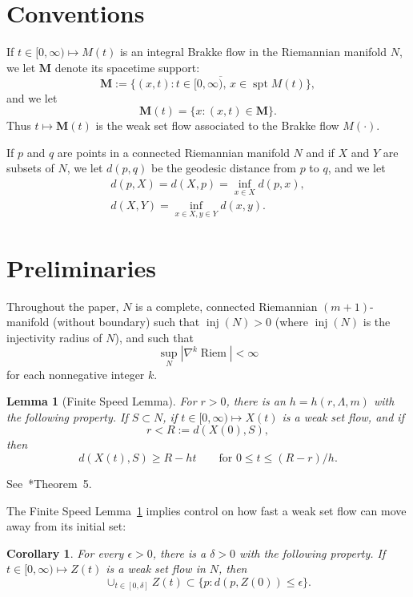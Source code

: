 \documentclass{amsart}
\newcommand{\inj}{\operatorname{inj}}    %
\newcommand{\MMM}{\mathbf M}
\newcommand{\Riem}{\operatorname{Riem}}
\newcommand{\eps}{\epsilon}
\newcommand{\spt}{\operatorname{spt}}
\newtheorem{lemma}      [theorem]       {Lemma}
\newtheorem{corollary}  [theorem]     {Corollary}
\theoremstyle{definition}
\theoremstyle{definition}
\begin{document}
\section{Conventions}\label{conventions-section}


If $t\in [0,\infty)\mapsto M(t)$ is an integral 
Brakke flow in the Riemannian manifold $N$, we let $\MMM$ denote
its spacetime support:
\[
   \MMM:= \overline{ \{ (x,t): t\in [0,\infty), \, x\in \spt M(t)\} },
\]
and we let
\[
   \MMM(t) = \{x: (x,t)\in \MMM\}.
\]
Thus $t\mapsto \MMM(t)$ is the weak set flow associated to the Brakke flow $M(\cdot)$.


If $p$ and $q$ are points in a connected Riemannian manifold $N$ and if $X$ and $Y$ are subsets of $N$,
we let $d(p,q)$ be the geodesic distance from $p$ to $q$, and we let
\begin{gather*}
d(p,X) = d(X,p) = \inf_{x\in X} d(p,x), \\
d(X,Y) = \inf_{x\in X, y\in Y} d(x,y).
\end{gather*}


\section{Preliminaries}\label{prelim-section}





Throughout the paper, $N$ is a complete, connected Riemannian $(m+1)$-manifold (without boundary)
such that $\inj(N)>0$ (where $\inj(N)$ is the injectivity radius of $N$), and such that
\[
  \sup_N |\nabla^k \Riem|  <\infty
\]
for each nonnegative integer $k$.

\begin{lemma}[Finite Speed Lemma]\label{speed-lemma}
For $r>0$, there is an $h=h(r,\Lambda,m)$ with the following property.
If $S\subset N$, if $t\in [0,\infty)\mapsto X(t)$ is a weak set flow, and if
\[
    r < R:=d(X(0),S),
\]
then
\[
    d(X(t),S) \ge R - ht  \qquad\text{for $0\le t \le (R-r)/h$}.
\]
\end{lemma}

See~\cite{hershkovits-w-avoid}*{Theorem~5}.

The Finite Speed Lemma~\ref{speed-lemma}
implies control on how fast a weak set flow can move away from its initial set:

\begin{corollary}\label{speed-corollary}
For every $\eps>0$, there is a $\delta>0$ with the following property.
If $t\in[0,\infty)\mapsto Z(t)$ is a weak set flow in $N$, then
\[
  \cup_{t\in [0,\delta]} Z(t) \subset \{p:   d(p,Z(0)) \le \eps\}.
\]
\end{corollary}
\end{document}
